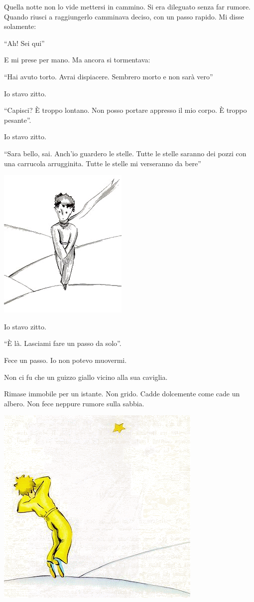 \documentclass[11pt]{scrbook}
\begin{document}
Quella notte non lo vide mettersi in cammino. Si era dileguato senza far
rumore. Quando riusci a raggiungerlo camminava deciso, con un passo
rapido. Mi disse solamente:

``Ah! Sei qui''

E mi prese per mano. Ma ancora si tormentava:

``Hai avuto torto. Avrai dispiacere. Sembrero morto e non sarà vero''

Io stavo zitto.

``Capisci? È troppo lontano. Non posso portare appresso il mio corpo. È
troppo pesante''.

Io stavo zitto.

``Sara bello, sai. Anch'io guardero le stelle. Tutte le stelle saranno
dei pozzi con una carrucola arrugginita. Tutte le stelle mi verseranno
da bere''

\begin{center}
\includegraphics{img/26c}
\end{center}

Io stavo zitto.

``È là. Lasciami fare un passo da solo''.

Fece un passo. Io non potevo muovermi.

Non ci fu che un guizzo giallo vicino alla sua caviglia.

Rimase immobile per un istante. Non grido. Cadde dolcemente come cade un
albero. Non fece neppure rumore sulla sabbia.

\begin{center}
\includegraphics{img/zlaty}
\end{center}
\end{document}
